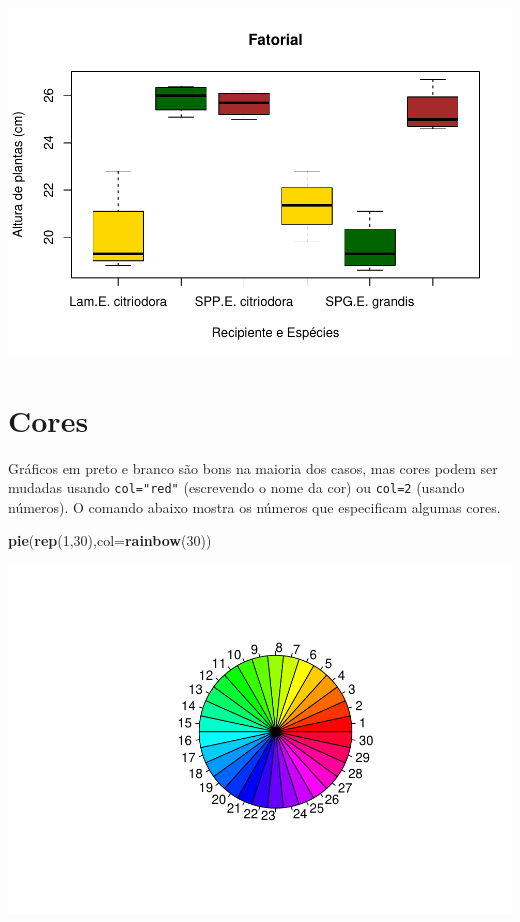\documentclass[
]{book}
\newenvironment{Shaded}{\begin{snugshade}}{\end{snugshade}}
\newcommand{\DataTypeTok}[1]{\textcolor[rgb]{0.13,0.29,0.53}{#1}}
\newcommand{\DecValTok}[1]{\textcolor[rgb]{0.00,0.00,0.81}{#1}}
\newcommand{\KeywordTok}[1]{\textcolor[rgb]{0.13,0.29,0.53}{\textbf{#1}}}
\newcommand{\NormalTok}[1]{#1}
\begin{document}
\includegraphics{TudodoR_files/figure-latex/unnamed-chunk-174-1.pdf}

\hypertarget{cores}{%
\section{Cores}\label{cores}}

Gráficos em preto e branco são bons na maioria dos casos, mas cores podem ser mudadas usando \texttt{col="red"} (escrevendo o nome da cor) ou \texttt{col=2} (usando números).
O comando abaixo mostra os números que especificam algumas cores.

\begin{Shaded}
\begin{Highlighting}[]
\KeywordTok{pie}\NormalTok{(}\KeywordTok{rep}\NormalTok{(}\DecValTok{1}\NormalTok{,}\DecValTok{30}\NormalTok{),}\DataTypeTok{col=}\KeywordTok{rainbow}\NormalTok{(}\DecValTok{30}\NormalTok{))}
\end{Highlighting}
\end{Shaded}

\includegraphics{TudodoR_files/figure-latex/unnamed-chunk-175-1.pdf}
\end{document}
